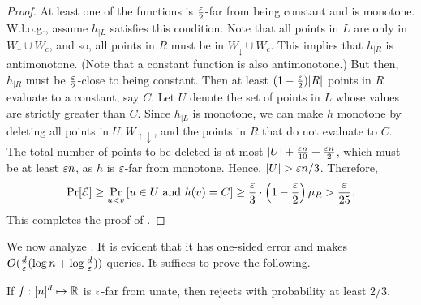 \begin{proof}
 At least one of the functions is $\frac{\varepsilon} 2$-far from being constant and is monotone.
W.l.o.g., assume $h_{|L}$ satisfies this condition.
Note that all points in $L$ are only in $W_{\uparrow}\cup W_c$, and so, all points in $R$ must be in $W_{\downarrow}\cup W_c$.
This implies that $h_{|R}$ is antimonotone. (Note that a constant function is also antimonotone.)
But then, $h_{|R}$ must be $\frac {\varepsilon} 2$-close to being constant.
Then at least $(1-\frac{\varepsilon} 2)|R|$ points in $R$ evaluate to a constant, say $C$.
Let $U$ denote the set of points in $L$ whose values are strictly
greater than $C$. Since $h_{|L}$ is monotone, we can make
$h$ monotone by deleting all points in $U, W_{\uparrow \downarrow}$,
and the points in $R$ that do not evaluate to $C$.
The total number of points to be deleted is at most $|U| + \frac{\varepsilon n}{10} + \frac{\varepsilon n}{2}$, which must be at least $\varepsilon n$, as $h$ is $\varepsilon$-far from monotone. Hence, $|U| > \varepsilon n/3$.
Therefore,
\[
\Pr[{\cal E}] \geq \Pr\limits_{u < v} \left[ u \in U \textrm{ and } h(v) = C \right] \geq \frac{\varepsilon}{3} \cdot  \left(1 - \frac{\varepsilon} 2 \right)\mu_R  > \frac{\varepsilon}{25} .
\]
This completes the proof of .
\end{proof}

We now analyze .
It is evident that it has one-sided error and makes
$O(\frac d {\varepsilon}(\log n + \log\frac d{\varepsilon}))$ queries.
It suffices to prove the following.

\begin{theorem} \label{thm:non-adap-hyper} If $f:[n]^d \mapsto {\mathbb R}$ is $\varepsilon$-far
	from unate, then  rejects with probability at least $2/3$.
\end{theorem}

